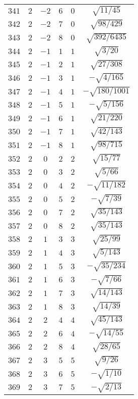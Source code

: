 \begin{table}
\begin{center}
\begin{tabular}{|c|c|c|c|c|c|}
$341$ & $2$ & $-2$ & $6$ & $0$ & $\sqrt{11/45}$ \\ 
$342$ & $2$ & $-2$ & $7$ & $0$ & $\sqrt{98/429}$ \\ 
$343$ & $2$ & $-2$ & $8$ & $0$ & $\sqrt{392/6435}$ \\ 
$344$ & $2$ & $-1$ & $1$ & $1$ & $\sqrt{3/20}$ \\ 
$345$ & $2$ & $-1$ & $2$ & $1$ & $\sqrt{27/308}$ \\ 
$346$ & $2$ & $-1$ & $3$ & $1$ & $-\sqrt{4/165}$ \\ 
$347$ & $2$ & $-1$ & $4$ & $1$ & $-\sqrt{180/1001}$ \\ 
$348$ & $2$ & $-1$ & $5$ & $1$ & $-\sqrt{5/156}$ \\ 
$349$ & $2$ & $-1$ & $6$ & $1$ & $\sqrt{21/220}$ \\ 
$350$ & $2$ & $-1$ & $7$ & $1$ & $\sqrt{42/143}$ \\ 
$351$ & $2$ & $-1$ & $8$ & $1$ & $\sqrt{98/715}$ \\ 
$352$ & $2$ & $0$ & $2$ & $2$ & $\sqrt{15/77}$ \\ 
$353$ & $2$ & $0$ & $3$ & $2$ & $\sqrt{5/66}$ \\ 
$354$ & $2$ & $0$ & $4$ & $2$ & $-\sqrt{11/182}$ \\ 
$355$ & $2$ & $0$ & $5$ & $2$ & $-\sqrt{7/39}$ \\ 
$356$ & $2$ & $0$ & $7$ & $2$ & $\sqrt{35/143}$ \\ 
$357$ & $2$ & $0$ & $8$ & $2$ & $\sqrt{35/143}$ \\ 
$358$ & $2$ & $1$ & $3$ & $3$ & $\sqrt{25/99}$ \\ 
$359$ & $2$ & $1$ & $4$ & $3$ & $\sqrt{5/143}$ \\ 
$360$ & $2$ & $1$ & $5$ & $3$ & $-\sqrt{35/234}$ \\ 
$361$ & $2$ & $1$ & $6$ & $3$ & $-\sqrt{7/66}$ \\ 
$362$ & $2$ & $1$ & $7$ & $3$ & $\sqrt{14/143}$ \\ 
$363$ & $2$ & $1$ & $8$ & $3$ & $\sqrt{14/39}$ \\ 
$364$ & $2$ & $2$ & $4$ & $4$ & $\sqrt{45/143}$ \\ 
$365$ & $2$ & $2$ & $6$ & $4$ & $-\sqrt{14/55}$ \\ 
$366$ & $2$ & $2$ & $8$ & $4$ & $\sqrt{28/65}$ \\ 
$367$ & $2$ & $3$ & $5$ & $5$ & $\sqrt{9/26}$ \\ 
$368$ & $2$ & $3$ & $6$ & $5$ & $-\sqrt{1/10}$ \\ 
$369$ & $2$ & $3$ & $7$ & $5$ & $-\sqrt{2/13}$ \\ 

\end{tabular}
\end{center}
\end{table}
